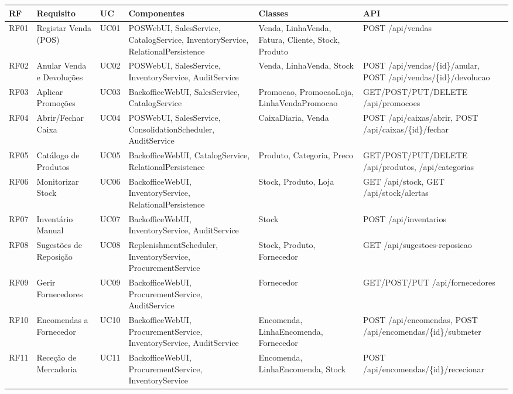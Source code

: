 \begin{table}[H]
\centering\scriptsize
\renewcommand{\arraystretch}{1.2}
\begin{tabular}{|p{0.7cm}|p{2.6cm}|p{0.6cm}|p{3.5cm}|p{2.8cm}|p{2.4cm}|}
\hline
\textbf{RF} & \textbf{Requisito} & \textbf{UC} & \textbf{Componentes} & \textbf{Classes} & \textbf{API} \\
\hline
RF01 & Registar Venda (POS) & UC01 & POSWebUI, SalesService, CatalogService, InventoryService, RelationalPersistence & Venda, LinhaVenda, Fatura, Cliente, Stock, Produto & POST /api/vendas \\
\hline
RF02 & Anular Venda e Devoluções & UC02 & POSWebUI, SalesService, InventoryService, AuditService & Venda, LinhaVenda, Stock & POST /api/vendas/\{id\}/anular, POST /api/vendas/\{id\}/devolucao \\
\hline
RF03 & Aplicar Promoções & UC03 & BackofficeWebUI, SalesService, CatalogService & Promocao, PromocaoLoja, LinhaVendaPromocao & GET/POST/PUT/DELETE /api/promocoes \\
\hline
RF04 & Abrir/Fechar Caixa & UC04 & POSWebUI, SalesService, ConsolidationScheduler, AuditService & CaixaDiaria, Venda & POST /api/caixas/abrir, POST /api/caixas/\{id\}/fechar \\
\hline
RF05 & Catálogo de Produtos & UC05 & BackofficeWebUI, CatalogService, RelationalPersistence & Produto, Categoria, Preco & GET/POST/PUT/DELETE /api/produtos, /api/categorias \\
\hline
RF06 & Monitorizar Stock & UC06 & BackofficeWebUI, InventoryService, RelationalPersistence & Stock, Produto, Loja & GET /api/stock, GET /api/stock/alertas \\
\hline
RF07 & Inventário Manual & UC07 & BackofficeWebUI, InventoryService, AuditService & Stock & POST /api/inventarios \\
\hline
RF08 & Sugestões de Reposição & UC08 & ReplenishmentScheduler, InventoryService, ProcurementService & Stock, Produto, Fornecedor & GET /api/sugestoes-reposicao \\
\hline
RF09 & Gerir Fornecedores & UC09 & BackofficeWebUI, ProcurementService, AuditService & Fornecedor & GET/POST/PUT /api/fornecedores \\
\hline
RF10 & Encomendas a Fornecedor & UC10 & BackofficeWebUI, ProcurementService, InventoryService, AuditService & Encomenda, LinhaEncomenda, Fornecedor & POST /api/encomendas, POST /api/encomendas/\{id\}/submeter \\
\hline
RF11 & Receção de Mercadoria & UC11 & BackofficeWebUI, ProcurementService, InventoryService & Encomenda, LinhaEncomenda, Stock & POST /api/encomendas/\{id\}/rececionar \\

\end{tabular}
\end{table}
